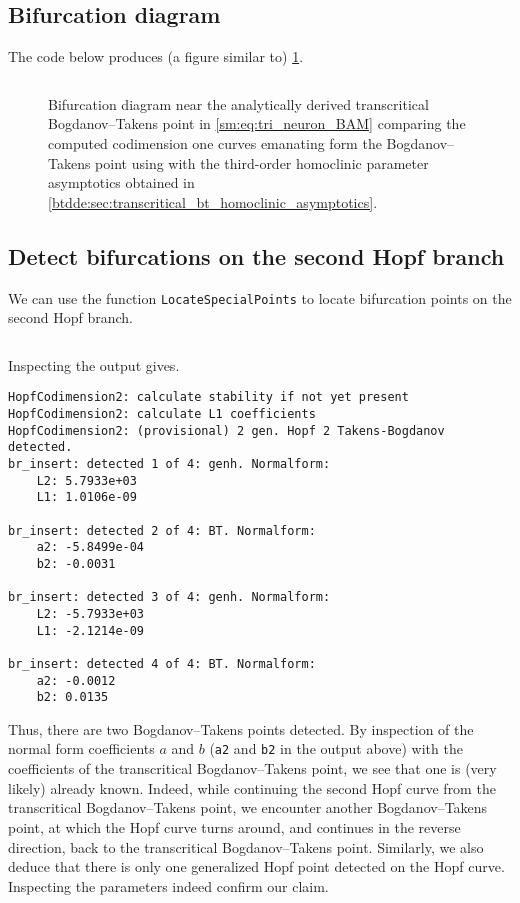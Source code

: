 \subsection{Bifurcation diagram}
The code below produces (a figure similar to) \cref{sm:fig:triNeuronBAMNeuralNetworkModelCompareParametersSupplementI}.
\inputminted[firstline=148, lastline=175]{MATLAB}{\pathToDDEBifToolDemos/BAM_neural_network_model/BAMnn.m}
%
\begin{figure}[ht]
\caption{Bifurcation diagram near the analytically derived transcritical
    Bogdanov--Takens point in \cref{sm:eq:tri_neuron_BAM} comparing the
    computed codimension one curves emanating form the Bogdanov--Takens point
    using \DDEBIFTOOL with the third-order homoclinic parameter asymptotics
    obtained in \cref{btdde:sec:transcritical_bt_homoclinic_asymptotics}.}
\label{sm:fig:triNeuronBAMNeuralNetworkModelCompareParametersSupplementI}
\end{figure}

\subsection{Detect bifurcations on the second Hopf branch}
We can use the \DDEBIFTOOL function \texttt{LocateSpecialPoints} to
locate bifurcation points on the second Hopf branch.
\inputminted[firstline=177, lastline=178]{MATLAB}{\pathToDDEBifToolDemos/BAM_neural_network_model/BAMnn.m}

Inspecting the \MATLAB output gives.
\begin{verbatim}
HopfCodimension2: calculate stability if not yet present
HopfCodimension2: calculate L1 coefficients
HopfCodimension2: (provisional) 2 gen. Hopf 2 Takens-Bogdanov  detected.
br_insert: detected 1 of 4: genh. Normalform:
    L2: 5.7933e+03
    L1: 1.0106e-09

br_insert: detected 2 of 4: BT. Normalform:
    a2: -5.8499e-04
    b2: -0.0031

br_insert: detected 3 of 4: genh. Normalform:
    L2: -5.7933e+03
    L1: -2.1214e-09

br_insert: detected 4 of 4: BT. Normalform:
    a2: -0.0012
    b2: 0.0135
\end{verbatim}
Thus, there are two Bogdanov--Takens points detected. By inspection of the normal
form coefficients $a$ and $b$ (\texttt{a2} and
\texttt{b2} in the output above) with the coefficients of the
transcritical Bogdanov--Takens point, we see that one is (very likely) already
known. Indeed, while continuing the second Hopf curve from the transcritical
Bogdanov--Takens point, we encounter another Bogdanov--Takens point, at which
the Hopf curve turns around, and continues in the reverse direction, back to
the transcritical Bogdanov--Takens point. Similarly, we also deduce that there
is only one generalized Hopf point detected on the Hopf curve. Inspecting 
the parameters indeed confirm our claim.

